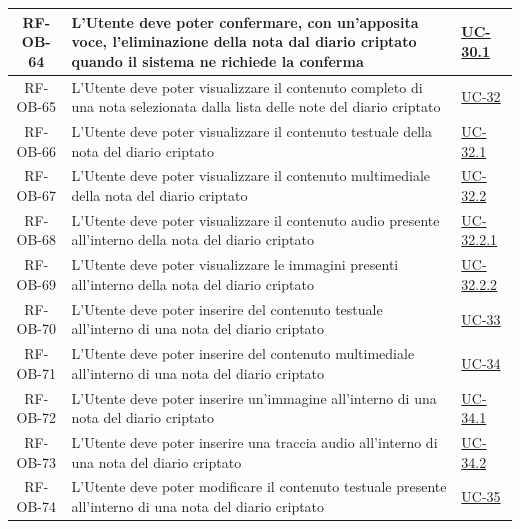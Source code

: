 \documentclass[a4paper,12pt]{article}
\begin{document}
\begin{center}
\begin{longtable}{|c|p{8.5cm}|>{\centering\arraybackslash}p{4cm}|}
RF-OB-64 & L'Utente deve poter confermare, con un'apposita voce, l'eliminazione della nota dal diario criptato quando il sistema ne richiede la conferma & \hyperref[subsec:UC-30.1]{UC-30.1} \\
\hline

RF-OB-65 & L'Utente deve poter visualizzare il contenuto completo di una nota selezionata dalla lista delle note del diario criptato & \hyperref[subsec:UC-32]{UC-32} \\
\hline

RF-OB-66 & L'Utente deve poter visualizzare il contenuto testuale della nota del diario criptato & \hyperref[subsec:UC-32.1]{UC-32.1} \\
\hline

RF-OB-67 & L'Utente deve poter visualizzare il contenuto multimediale della nota del diario criptato & \hyperref[subsec:UC-32.2]{UC-32.2} \\
\hline

RF-OB-68 & L'Utente deve poter visualizzare il contenuto audio presente all'interno della nota del diario criptato & \hyperref[subsec:UC-32.2.1]{UC-32.2.1} \\
\hline

RF-OB-69 & L'Utente deve poter visualizzare le immagini presenti all'interno della nota del diario criptato & \hyperref[subsec:UC-32.2.2]{UC-32.2.2} \\
\hline

RF-OB-70 & L'Utente deve poter inserire del contenuto testuale all'interno di una nota del diario criptato & \hyperref[subsec:UC-33]{UC-33} \\
\hline

RF-OB-71 & L'Utente deve poter inserire del contenuto multimediale all'interno di una nota del diario criptato & \hyperref[subsec:UC-34]{UC-34} \\
\hline

RF-OB-72 & L'Utente deve poter inserire un'immagine all'interno di una nota del diario criptato & \hyperref[subsec:UC-34.1]{UC-34.1} \\
\hline

RF-OB-73 & L'Utente deve poter inserire una traccia audio all'interno di una nota del diario criptato & \hyperref[subsec:UC-34.2]{UC-34.2} \\
\hline

RF-OB-74 & L'Utente deve poter modificare il contenuto testuale presente all'interno di una nota del diario criptato & \hyperref[subsec:UC-35]{UC-35} \\
\hline


\end{longtable}
\end{center}
\end{document}
